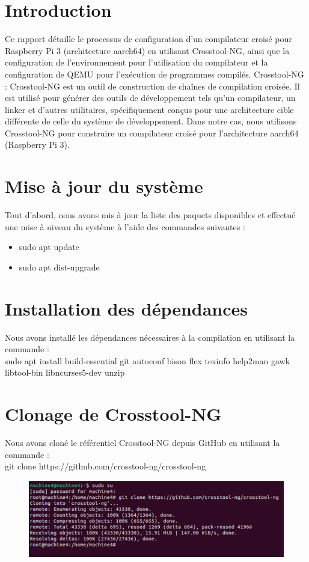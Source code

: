\section*{Introduction}
Ce rapport détaille le processus de configuration d'un compilateur croisé pour Raspberry Pi 3 (architecture aarch64) en utilisant Crosstool-NG, ainsi que la configuration de l'environnement pour l'utilisation du compilateur et la configuration de QEMU pour l'exécution de programmes compilés.
Crosstool-NG : Crosstool-NG est un outil de construction de chaînes de compilation croisée. Il est utilisé pour générer des outils de développement tels qu'un compilateur, un linker et d'autres utilitaires, spécifiquement conçus pour une architecture cible différente de celle du système de développement. Dans notre cas, nous utilisons Crosstool-NG pour construire un compilateur croisé pour l'architecture aarch64 (Raspberry Pi 3).
\section{Mise à jour du système }
Tout d'abord, nous avons mis à jour la liste des paquets disponibles et effectué une mise à niveau du système à l'aide des commandes suivantes :
\begin{itemize}
    \item sudo apt update
     \item sudo apt dist-upgrade
\end{itemize}
\section{Installation des dépendances}
Nous avons installé les dépendances nécessaires à la compilation en utilisant la commande :
\\sudo apt install build-essential git autoconf bison flex texinfo help2man gawk libtool-bin libncurses5-dev unzip 


\section{Clonage de Crosstool-NG }
Nous avons cloné le référentiel Crosstool-NG depuis GitHub en utilisant la commande :
\\git clone https://github.com/crosstool-ng/crosstool-ng 
\begin{figure}[h]
    \centering
    \includegraphics[width=1\textwidth]{images/8.png}
    
\end{figure}
